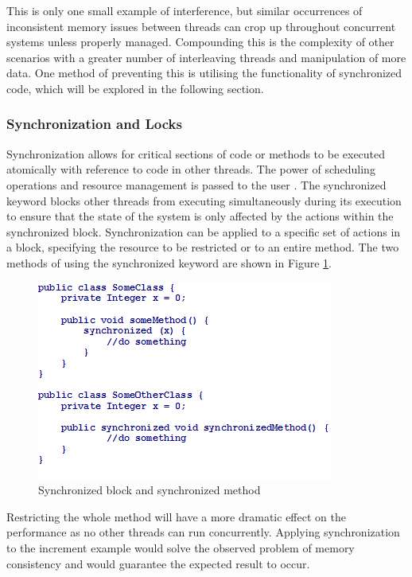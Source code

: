 \documentclass[a4paper,12pt]{article}
\begin{document}
 

This is only one small example of interference, but similar occurrences of inconsistent memory issues between threads can crop up throughout concurrent systems unless properly managed. Compounding this is the complexity of other scenarios with a greater number of interleaving threads and manipulation of more data. One method of preventing this is utilising the functionality of synchronized code, which will be explored in the following section.


\subsubsection{Synchronization and Locks}
    
Synchronization allows for critical sections of code or methods to be executed atomically with reference to code in other threads. The power of scheduling operations and resource management is passed to the user \citep{silberschatz13}. The synchronized keyword blocks other threads from executing simultaneously during its execution to ensure that the state of the system is only affected by the actions within the synchronized block. Synchronization can be applied to a specific set of actions in a block, specifying the resource to be restricted or to an entire method. The two methods of using the synchronized keyword are shown in Figure \ref{fig:synchronized}. 

\begin{figure}[h]
    \includegraphics{synchronized.png}
    \caption{Synchronized block and synchronized method}
    \label{fig:synchronized}
\end{figure}

Restricting the whole method will have a more dramatic effect on the performance as no other threads can run concurrently. Applying synchronization to the increment example would solve the observed problem of memory consistency and would guarantee the expected result to occur.
\end{document}
